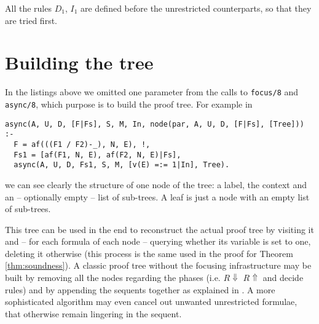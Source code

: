 All the rules $D_1$, $I_1$ are defined before the unrestricted counterparts, so that they are tried first.

\section{Building the tree}
In the listings above we omitted one parameter from the calls to \texttt{focus/8} and \texttt{async/8}, which purpose is to build the proof tree.
For example in
\begin{verbatim}
async(A, U, D, [F|Fs], S, M, In, node(par, A, U, D, [F|Fs], [Tree])) :- 
  F = af(((F1 / F2)-_), N, E), !,
  Fs1 = [af(F1, N, E), af(F2, N, E)|Fs],
  async(A, U, D, Fs1, S, M, [v(E) =:= 1|In], Tree).
\end{verbatim}
we can see clearly the structure of one node of the tree: a label, the context and an -- optionally empty -- list of sub-trees.
A leaf is just a node with an empty list of sub-trees.

This tree can be used in the end to reconstruct the actual proof tree by visiting it and -- for each formula of each node -- querying whether its variable is set to one, deleting it otherwise (this process is the same used in the proof for Theorem \ref{thm:soundness}).
A classic proof tree without the focusing infrastructure may be built by removing all the nodes regarding the phases (i.e. $R\!\Downarrow$ $R\!\Uparrow$ and decide rules) and by appending the sequents together as explained in \cite{Focusing}. 
A more sophisticated algorithm may even cancel out unwanted unrestricted formulae, that otherwise remain lingering in the sequent.

